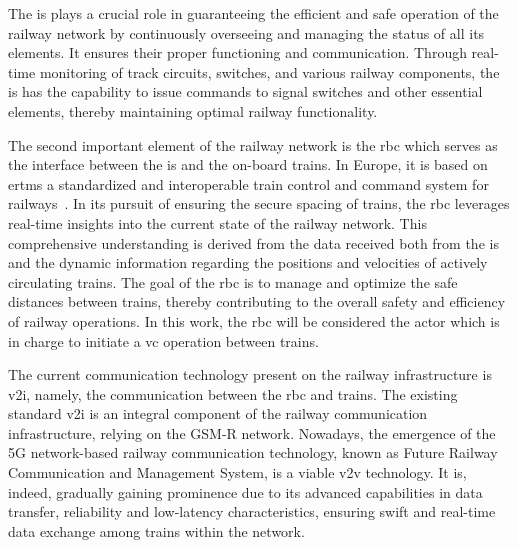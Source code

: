 \documentclass[letterpaper, 10 pt, conference]{ieeeconf}
\theoremstyle{definition}
\theoremstyle{nopoint}
\begin{document}
The \gls{is} plays a crucial role in guaranteeing the efficient and safe operation of the railway network by continuously overseeing and managing the status of all its elements. It ensures their proper functioning and communication. Through real-time monitoring of track circuits, switches, and various railway components, the \gls{is} has the capability to issue commands to signal switches and other essential elements, thereby maintaining optimal railway functionality.

The second important element of the railway network is the \gls{rbc} which serves as the interface between the \gls{is} and the on-board trains. In Europe, it is based on \gls{ertms} a standardized and interoperable train control and command system for railways~\cite{ertms}. In its pursuit of ensuring the secure spacing of trains, the \gls{rbc} leverages real-time insights into the current state of the railway network. This comprehensive understanding is derived from the data received both from the \gls{is} and the dynamic information regarding the positions and velocities of actively circulating trains. The goal of the \gls{rbc} is to manage and optimize the safe distances between trains, thereby contributing to the overall safety and efficiency of railway operations. In this work, the \gls{rbc} will be considered the actor which is in charge to initiate a \gls{vc} operation between trains.
%

\begin{comment}
	To better understand the structure and complexity of the railway network, Figure \ref{fig:railwayNetwork} illustrates the various components and their interconnections. As the latter demonstrates, the \gls{is} is the core of the entire system, with all the railway elements and the \gls{rbc} connected to it. This allows for centralized control and real-time monitoring of the entire network, ensuring the safe and efficient operation of the railway system.
\end{comment}


The current communication technology present on the railway infrastructure is \gls{v2i}, namely, the communication between the \gls{rbc} and trains. The existing standard \gls{v2i} is an integral component of the railway communication infrastructure, relying on the GSM-R network. Nowadays, the emergence of the 5G network-based railway communication technology, known as Future Railway Communication and Management System\cite{frmcs}, is a viable \gls{v2v} technology. It is, indeed,  gradually gaining prominence due to its advanced capabilities in data transfer, reliability and  low-latency characteristics, ensuring swift and real-time data exchange among trains within the network.
\end{document}
